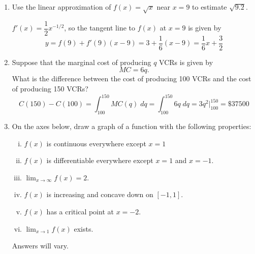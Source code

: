\documentclass[11pt]{article}
\newcommand{\ds}{\displaystyle}
\begin{document}
\begin{enumerate}
\item Use the linear approximation of $f(x)=\sqrt{x}$ near $x=9$ to
  estimate $\sqrt{9.2}$.

  \vfill
  $f'(x)=\dfrac{1}{2}x^{-1/2}$, so the
  tangent line to $f(x)$ at $x=9$ is given by
  \[
  y=f(9)+f'(9)(x-9) = 3 + \frac{1}{6}(x-9) = \frac{1}{6} x + \frac{3}{2}
  \]
  \vfill

  \newpage

\item Suppose that the marginal cost of producing $q$ VCRs is given by
  \[
  MC = 6q.
  \]
  What is the difference between the cost of producing 100 VCRs and
  the cost of producing 150 VCRs?
  \vfill
  \[
  C(150)-C(100)=\int_{100}^{150} MC(q)\;dq = \int_{100}^{150} 6q\;dq =
  3q^2\big\vert_{100}^{150} = \$ 37500
  \]
  \vfill

\item On the axes below, draw a graph of a function with the following
  properties:
  \begin{multicols}{2}
    \begin{enumerate}[(i)]
    \item $f(x)$ is continuous everywhere except $x=1$
    \item $f(x)$ is differentiable everywhere except $x=1$ and $x=-1$.
    \item $\ds\lim_{x\to\infty} f(x) = 2$.
    \item $f(x)$ is increasing and concave down on $[-1,1]$.
    \item $f(x)$ has a critical point at $x=-2$.
    \item $\ds\lim_{x\to 1} f(x)$ exists.
    \end{enumerate}
  \end{multicols}
  \vfill
  \begin{center}
    Answers will vary.
  \end{center}
  \vfill
\end{enumerate}
\end{document}
